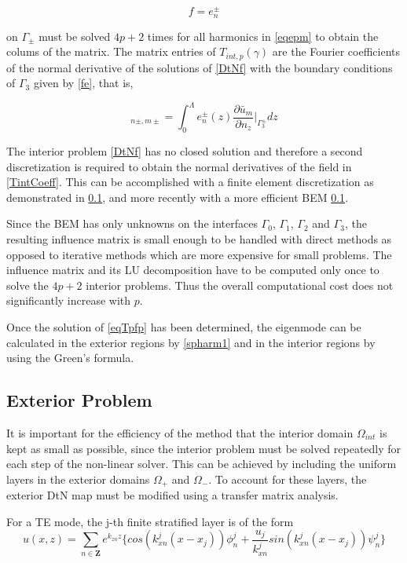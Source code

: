 \begin{equation}
  f = e_n^\pm
\label{fe}
\end{equation} 

on $\Gamma_\pm$ must be solved $4p+2$ times for all harmonics in
\ref{eqepm} to obtain the colums of the matrix. The matrix entries of
$T_{int,p}(\gamma)$ are the Fourier coefficients of the normal
derivative of the solutions of \ref{DtNf} with the boundary conditions of
$\Gamma_3$ given by \ref{fe}, that is,

\begin{equation}
[T_{int,p}(\gamma)]_{n \pm,m \pm} = \int_0^\Lambda e_n^\pm(z)
\frac{\partial \bar{u}_m}{\partial n_z} \bigg|_{\Gamma_3^\pm} dz
\label{TintCoeff}
\end{equation}

The interior problem \ref{DtNf} has no closed solution and therefore a
second discretization is required to obtain the normal derivatives of
the field in \ref{TintCoeff}. This can be accomplished with a finite
element discretization as demonstrated in \ref{}, and more recently
with a more efficient BEM \ref{}.

Since the BEM has only unknowns on the interfaces $\Gamma_0$,
$\Gamma_1$, $\Gamma_2$ and $\Gamma_3$, the resulting influence matrix
is small enough to be handled with direct methods as opposed to
iterative methods which are more expensive for small problems. The
influence matrix and its LU decomposition have to be computed only
once to solve the $4p+2$ interior problems. Thus the overall
computational cost does not significantly increase with $p$.

Once the solution of \ref{eqTpfp} has been determined, the eigenmode can be
calculated in the exterior regions by \ref{spharm1} and in the interior
regions by using the Green's formula.

\subsection{Exterior Problem}
It is important for the efficiency of the method that the interior
domain $\Omega_{int}$ is kept as small as possible, since the interior
problem must be solved repeatedly for each step of the non-linear
solver. This can be achieved by including the uniform layers in the
exterior domains $\Omega_+$ and $\Omega_-$. To account for these
layers, the exterior DtN map must be modified using a transfer matrix
analysis.

For a TE mode, the j-th finite stratified layer is of the form
\begin{equation}
u(x,z) = \sum_{n \in \mathbf{Z}} e^{k_{zn} z} \{cos(k_{xn}^j(x-x_j))
\phi_n^j + \frac{u_j}{k_{xn}^j} sin(k_{xn}^j(x-x_j))\psi_n^j \}
\end{equation}

